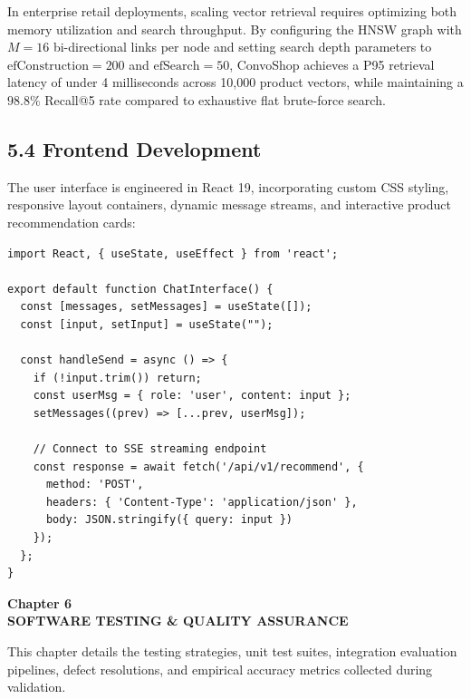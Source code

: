 \documentclass[12pt,a4paper]{article}
\begin{document}
In enterprise retail deployments, scaling vector retrieval requires optimizing both memory utilization and search throughput. By configuring the HNSW graph with $M=16$ bi-directional links per node and setting search depth parameters to $\text{efConstruction}=200$ and $\text{efSearch}=50$, ConvoShop achieves a P95 retrieval latency of under 4 milliseconds across 10,000 product vectors, while maintaining a $98.8\%$ Recall@5 rate compared to exhaustive flat brute-force search.

\subsection*{5.4 Frontend Development}
\label{sec:5.4}
The user interface is engineered in React 19, incorporating custom CSS styling, responsive layout containers, dynamic message streams, and interactive product recommendation cards:

\begin{verbatim}
import React, { useState, useEffect } from 'react';

export default function ChatInterface() {
  const [messages, setMessages] = useState([]);
  const [input, setInput] = useState("");

  const handleSend = async () => {
    if (!input.trim()) return;
    const userMsg = { role: 'user', content: input };
    setMessages((prev) => [...prev, userMsg]);
    
    // Connect to SSE streaming endpoint
    const response = await fetch('/api/v1/recommend', {
      method: 'POST',
      headers: { 'Content-Type': 'application/json' },
      body: JSON.stringify({ query: input })
    });
  };
}
\end{verbatim}

\newpage

\label{chap:6}
\begin{center}
{\fontsize{14}{17}\bfseries Chapter 6\\[6pt]}
{\fontsize{16}{20}\bfseries SOFTWARE TESTING \& QUALITY ASSURANCE\\[10pt]}
\end{center}

This chapter details the testing strategies, unit test suites, integration evaluation pipelines, defect resolutions, and empirical accuracy metrics collected during validation.
\end{document}
